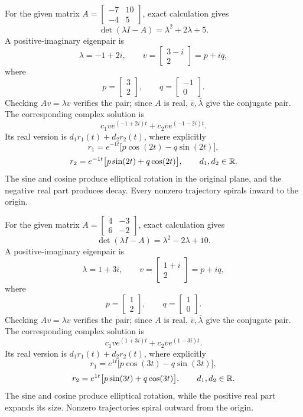 For the given matrix $A=\left[\begin{matrix}-7 & 10\\-4 & 5\end{matrix}\right]$, exact calculation gives
\[\det(\lambda I-A)=\lambda^{2} + 2 \lambda + 5.\]
A positive-imaginary eigenpair is
\[\lambda=-1 + 2 i,\qquad v=\left[\begin{matrix}3 - i\\2\end{matrix}\right]=p+iq,\]
where
\[p=\left[\begin{matrix}3\\2\end{matrix}\right],\qquad q=\left[\begin{matrix}-1\\0\end{matrix}\right].\]
Checking $Av=\lambda v$ verifies the pair; since $A$ is real,
$\overline v,\overline\lambda$ give the conjugate pair.
The corresponding complex solution is
\[c_1ve^{(-1 + 2 i)t}+c_2\overline v e^{(-1 - 2 i)t}.
\]
Its real version is $d_1r_1(t)+d_2r_2(t)$, where explicitly
\[r_1=e^{-1t}\bigl[p\cos(2t)-q\sin(2t)\bigr],\]
\[r_2=e^{-1t}\bigl[p\sin(2t)+q\cos(2t)\bigr],\qquad d_1,d_2\in\mathbb{R}.\]
The sine and cosine produce elliptical rotation in the original plane,
and the negative real part produces decay. Every nonzero
trajectory spirals inward to the origin.

For the given matrix $A=\left[\begin{matrix}4 & -3\\6 & -2\end{matrix}\right]$, exact calculation gives
\[\det(\lambda I-A)=\lambda^{2} - 2 \lambda + 10.\]
A positive-imaginary eigenpair is
\[\lambda=1 + 3 i,\qquad v=\left[\begin{matrix}1 + i\\2\end{matrix}\right]=p+iq,\]
where
\[p=\left[\begin{matrix}1\\2\end{matrix}\right],\qquad q=\left[\begin{matrix}1\\0\end{matrix}\right].\]
Checking $Av=\lambda v$ verifies the pair; since $A$ is real,
$\overline v,\overline\lambda$ give the conjugate pair.
The corresponding complex solution is
\[c_1ve^{(1 + 3 i)t}+c_2\overline v e^{(1 - 3 i)t}.
\]
Its real version is $d_1r_1(t)+d_2r_2(t)$, where explicitly
\[r_1=e^{1t}\bigl[p\cos(3t)-q\sin(3t)\bigr],\]
\[r_2=e^{1t}\bigl[p\sin(3t)+q\cos(3t)\bigr],\qquad d_1,d_2\in\mathbb{R}.\]
The sine and cosine produce elliptical rotation, while the positive
real part expands its size. Nonzero trajectories spiral outward from
the origin.

